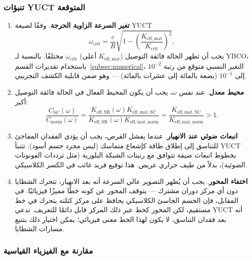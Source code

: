 \documentclass[12pt,a4paper]{article}
\begin{document}
	\subsubsection{تنبؤات YUCT المتوقعة}
	
	\begin{enumerate}
		\item \textbf{تغير السرعة الزاوية الحرجة}. وفقًا لصيغة YUCT
		\[
		\omega_{\text{crit}} = \frac{c}{R}\sqrt{1 - \left(\frac{K_{\mathrm{eff,mat}}}{K_{\mathrm{crit}}}\right)^2},
		\]
		يجب أن تظهر الحالة فائقة التوصيل (\(K_{\mathrm{eff,mat}}\) أعلى) \(\omega_{\text{crit}}\) مختلفًا. بالنسبة لـ YBCO، باستخدام تقديرات القسم~\ref{subsec:numerical}، التغير النسبي متوقع من رتبة \(10^{-2}\) إلى \(10^{-1}\) (بضعة بالمائة إلى عشرات بالمائة) — وهو ضمن قابلية الكشف التجريبي.
		
		\item \textbf{محيط معدل}. عند نفس \(\omega\)، يجب أن يكون المحيط الفعال في الحالة فائقة التوصيل أكبر:
		\[
		\frac{C_{\text{SC}}(\omega)}{C_{\text{norm}}(\omega)} = \frac{K_{\mathrm{eff,SR}}(\omega) K_{\mathrm{eff,mat,SC}}}{K_{\mathrm{eff,SR}}(\omega) K_{\mathrm{eff,mat,norm}}} = \frac{K_{\mathrm{eff,mat,SC}}}{K_{\mathrm{eff,mat,norm}}} > 1.
		\]
		
		\item \textbf{انبعاث ضوئي عند الانهيار}. عندما يفشل القرص، يجب أن يؤدي الفقدان المفاجئ للتناسق إلى إطلاق طاقة كإشعاع متماسك (ليس مجرد جسم أسود). تتنبأ YUCT بخطوط انبعاث ضيقة تتوافق مع رنينات الشبكة البلورية (مثل ترددات الفونونات الضوئية)، بدلاً من طيف حراري عريض. هذا توقيع فريد غائب في الكسر الكلاسيكي.
		
		\item \textbf{اختفاء المحور}. يجب أن يُظهر التصوير عالي السرعة أنه بعد الانهيار، تتحرك الشظايا دون أي مركز دوران مشترك — يتوقف المحور عن كونه خطًا مميزًا فيزيائيًا. في المقابل، فإن الجسم الجاسئ الكلاسيكي يحافظ على مركز كتلته يتحرك في خط مستقيم، لكن المحور كخط عبر ذلك المركز قابل دائمًا للتعريف. تدعي YUCT أنه بعد فقدان التناسق، لا يكون لهذا الخط معنى فيزيائي؛ يمكن اختبار ذلك بتتبع مسارات الشظايا.
	\end{enumerate}
	
	\subsubsection{مقارنة مع الفيزياء القياسية}
	
\end{document}
